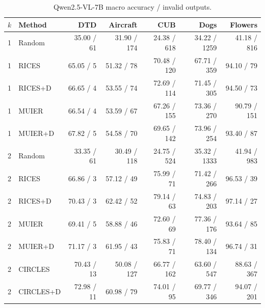 \documentclass[10pt,twocolumn,letterpaper]{article}
\begin{document}
\begin{table}[t]
\caption{Qwen2.5-VL-7B macro accuracy / invalid outputs.}
\label{sup:macro_invalid_1}
\centering\small
\begin{tabular}{llrrrrr}
\toprule
$k$ & Method & DTD & Aircraft & CUB & Dogs & Flowers \\
\midrule
1 & Random & 35.00 / 61 & 31.90 / 174 & 24.38 / 618 & 34.22 / 1259 & 41.18 / 816 \\
1 & RICES & 65.05 / 5 & 51.32 / 78 & 70.48 / 120 & 67.71 / 359 & 94.10 / 79 \\
1 & RICES+D & 66.65 / 4 & 53.55 / 74 & 72.69 / 114 & 71.45 / 305 & 94.50 / 73 \\
1 & MUIER & 66.54 / 4 & 53.59 / 67 & 67.26 / 155 & 73.36 / 270 & 90.79 / 151 \\
1 & MUIER+D & 67.82 / 5 & 54.58 / 70 & 69.65 / 142 & 73.96 / 254 & 93.40 / 87 \\
2 & Random & 33.35 / 61 & 30.49 / 118 & 24.75 / 524 & 35.32 / 1333 & 41.94 / 983 \\
2 & RICES & 66.86 / 3 & 57.12 / 49 & 75.99 / 71 & 71.42 / 266 & 96.53 / 39 \\
2 & RICES+D & 70.43 / 3 & 62.42 / 52 & 79.14 / 63 & 74.83 / 203 & 97.14 / 27 \\
2 & MUIER & 69.41 / 5 & 58.88 / 46 & 72.60 / 69 & 77.36 / 176 & 93.64 / 85 \\
2 & MUIER+D & 71.17 / 3 & 61.95 / 43 & 75.83 / 71 & 78.40 / 134 & 96.74 / 31 \\
2 & CIRCLES & 70.43 / 13 & 50.08 / 127 & 66.77 / 162 & 63.60 / 547 & 88.63 / 367 \\
2 & CIRCLES+D & 72.98 / 11 & 60.98 / 79 & 74.01 / 95 & 69.77 / 346 & 94.07 / 201 \\
\bottomrule
\end{tabular}
\end{table}
\end{document}

